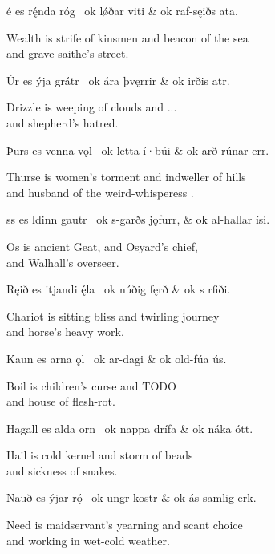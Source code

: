 \sectionline

\bvg\bva {}é es rę́nda róg \hld\ ok lǿðar viti &
\ind ok raf-sęiðs ata.\eva

\bvb Wealth is strife of kinsmen and beacon of the sea \\
\ind and grave-saithe’s  street.\evb\evg


\bvg\bva Úr es ýja grátr \hld\ ok ára þvęrrir &
\ind ok irðis atr.\eva

\bvb Drizzle is weeping of clouds and ... \\
\ind and shepherd’s hatred.\evb\evg


\bvg\bva Þurs es venna vǫl \hld\ ok letta í·búi &
\ind ok arð-rúnar err.\eva

\bvb Thurse is women’s torment and indweller of hills \\
\ind and husband of the weird-whisperess .\evb\evg


\bvg\bva {}ss es ldinn gautr \hld\ ok s-garðs jǫfurr, &
\ind ok al-hallar ísi.\eva

\bvb Os is ancient Geat, and Osyard’s chief, \\
\ind and Walhall’s overseer.\evb\evg


\bvg\bva Ręið es itjandi ę́la \hld\ ok núðig fęrð &
\ind ok s rfiði.\eva

\bvb Chariot is sitting bliss and twirling journey \\
\ind and horse’s heavy work.\evb\evg


\bvg\bva Kaun es arna ǫl \hld\ ok ar-dagi &
\ind ok old-fúa ús.\eva

\bvb Boil is children’s curse and TODO \\
\ind and house of flesh-rot.\evb\evg


\bvg\bva Hagall es alda orn \hld\ ok nappa drífa &
\ind ok náka ótt.\eva

\bvb Hail is cold kernel and storm of beads \\
\ind and sickness of snakes.\evb\evg


\bvg\bva Nauð es ýjar rǫ́ \hld\ ok ungr kostr &
\ind ok ás-samlig erk.\eva

\bvb Need is maidservant’s yearning and scant choice \\
\ind and working in wet-cold weather.\evb\evg


